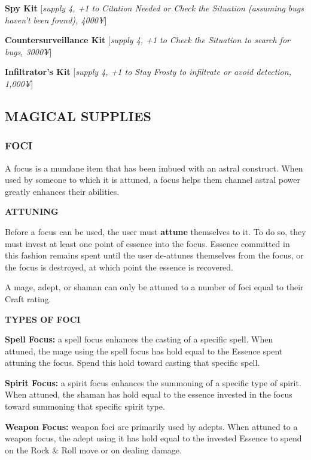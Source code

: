 \documentclass[oneside,10pt]{article}
\begin{document}
\begin{multicols}{2}
  \textbf{Spy Kit} [\textit{supply 4, +1 to Citation Needed or Check
    the Situation (assuming bugs haven’t been found), 4000¥}]

  \textbf{Countersurveillance Kit} [\textit{supply 4, +1 to Check the
    Situation to search for bugs, 3000¥}]

  \textbf{Infiltrator’s Kit} [\textit{supply 4, +1 to Stay Frosty to
    infiltrate or avoid detection, 1,000¥}]

  \subsection{MAGICAL SUPPLIES}
  \subsubsection{FOCI}
  A focus is a mundane item that has been imbued with an astral
  construct. When used by someone to which it is attuned, a focus
  helps them channel astral power greatly enhances their abilities.

  \textbf{ATTUNING}

  Before a focus can be used, the user must \textbf{attune} themselves
  to it. To do so, they must invest at least one point of essence into
  the focus. Essence committed in this fashion remains spent until the
  user de-attunes themselves from the focus, or the focus is
  destroyed, at which point the essence is recovered.

  A mage, adept, or shaman can only be attuned to a number of foci
  equal to their Craft rating.

  \textbf{TYPES OF FOCI}

  \begin{dent}
    \textbf{Spell Focus:} a spell focus enhances the casting of a
    specific spell. When attuned, the mage using the spell focus has
    hold equal to the Essence spent attuning the focus. Spend this hold
    toward casting that specific spell.

    \textbf{Spirit Focus:} a spirit focus enhances the summoning of a
    specific type of spirit. When attuned, the shaman has hold equal
    to the essence invested in the focus toward summoning that
    specific spirit type.

    \textbf{Weapon Focus:} weapon foci are primarily used by adepts.
    When attuned to a weapon focus, the adept using it has hold equal
    to the invested Essence to spend on the Rock \& Roll move or on
    dealing damage.
  \end{dent}


\end{multicols}
\end{document}
